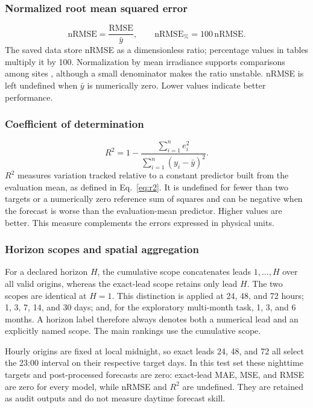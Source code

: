 \subsubsection{Normalized root mean squared error}

\begin{equation}
 \mathrm{nRMSE}
 =
 \frac{\mathrm{RMSE}}{\bar{y}},
 \qquad
 \mathrm{nRMSE}_{\%}=100\,\mathrm{nRMSE}.
 \label{eq:nrmse}
\end{equation}
The saved data store nRMSE as a dimensionless ratio; percentage values in
tables multiply it by 100. Normalization by mean irradiance supports
comparisons among sites \cite{voyant2022}, although a small denominator
makes the ratio unstable. nRMSE is left undefined when $\bar{y}$ is
numerically zero. Lower values indicate better performance.

\subsubsection{Coefficient of determination}

\begin{equation}
 R^2
 =
 1-
 \frac{\sum_{i=1}^{n}e_i^2}
      {\sum_{i=1}^{n}(y_i-\bar{y})^2}.
 \label{eq:r2}
\end{equation}
$R^2$ measures variation tracked relative to a constant predictor built from
the evaluation mean, as defined in Eq.~\eqref{eq:r2}. It is undefined for fewer
than two targets or a numerically zero reference sum of squares and can be
negative when the forecast is worse than the evaluation-mean predictor.
Higher values are better. This measure complements the errors expressed
in physical units.

\subsubsection{Horizon scopes and spatial aggregation}

For a declared horizon $H$, the cumulative scope concatenates leads
$1,\ldots,H$ over all valid origins, whereas the exact-lead scope retains only
lead $H$. The two scopes are identical at $H=1$. This distinction is applied at
24, 48, and 72 hours; 1, 3, 7, 14, and 30 days; and, for the exploratory
multi-month task, 1, 3, and 6 months. A horizon label therefore always denotes
both a numerical lead and an explicitly named scope. The main rankings use
the cumulative scope.

Hourly origins are fixed at local midnight, so exact leads 24, 48, and 72
all select the 23:00 interval on their respective target days. In this test
set these nighttime targets and post-processed forecasts are zero: exact-lead
MAE, MSE, and RMSE are zero for every model, while nRMSE and $R^2$ are undefined.
They are retained as audit outputs and do not measure daytime forecast skill.

